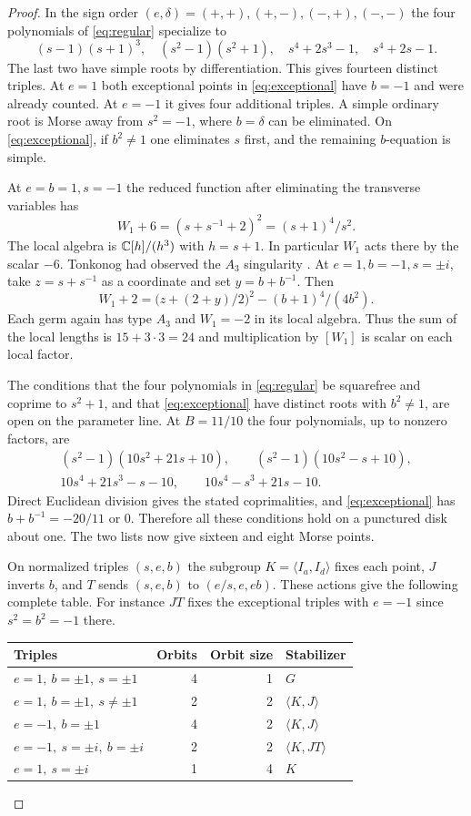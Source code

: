 \begin{proof}
In the sign order $(e,\delta)=(+,+),(+,-),(-,+),(-,-)$ the four polynomials of \eqref{eq:regular} specialize to
\[
 (s-1)(s+1)^3,\quad (s^2-1)(s^2+1),\quad s^4+2s^3-1,\quad s^4+2s-1 .
\]
The last two have simple roots by differentiation. This gives fourteen distinct triples. At $e=1$ both exceptional points in \eqref{eq:exceptional} have $b=-1$ and were already counted. At $e=-1$ it gives four additional triples. A simple ordinary root is Morse away from $s^2=-1$, where $b=\delta$ can be eliminated. On \eqref{eq:exceptional}, if $b^2\ne1$ one eliminates $s$ first, and the remaining $b$-equation is simple.

At $e=b=1,s=-1$ the reduced function after eliminating the transverse variables has
\[
             W_1+6=(s+s^{-1}+2)^2=(s+1)^4/s^2 .
\]
The local algebra is $\mathbb C[h]/(h^3)$ with $h=s+1$. In particular $W_1$ acts there by the scalar $-6$. Tonkonog had observed the $A_3$ singularity \cite[\S4.1]{Ton}. At $e=1,b=-1,s=\pm i$, take $z=s+s^{-1}$ as a coordinate and set $y=b+b^{-1}$. Then
\[
 W_1+2=\big(z+(2+y)/2\big)^2-(b+1)^4/(4b^2).
\]
Each germ again has type $A_3$ and $W_1=-2$ in its local algebra. Thus the sum of the local lengths is $15+3\cdot3=24$ and multiplication by $[W_1]$ is scalar on each local factor.

The conditions that the four polynomials in \eqref{eq:regular} be squarefree and coprime to $s^2+1$, and that \eqref{eq:exceptional} have distinct roots with $b^2\ne1$, are open on the parameter line. At $B=11/10$ the four polynomials, up to nonzero factors, are
\[
\begin{gathered}
 (s^2-1)(10s^2+21s+10),\qquad (s^2-1)(10s^2-s+10),\\
 10s^4+21s^3-s-10,\qquad 10s^4-s^3+21s-10 .
\end{gathered}
\]
Direct Euclidean division gives the stated coprimalities, and \eqref{eq:exceptional} has $b+b^{-1}=-20/11$ or $0$. Therefore all these conditions hold on a punctured disk about one. The two lists now give sixteen and eight Morse points.

On normalized triples $(s,e,b)$ the subgroup $K=\langle I_a,I_d\rangle$ fixes each point, $J$ inverts $b$, and $T$ sends $(s,e,b)$ to $(e/s,e,eb)$. These actions give the following complete table. For instance $JT$ fixes the exceptional triples with $e=-1$ since $s^2=b^2=-1$ there.
\begin{center}\small
\begin{tabular}{@{}lrrl@{}}\toprule
Triples & Orbits & Orbit size & Stabilizer\\\midrule
$e=1,\ b=\pm1,\ s=\pm1$ &4&1&$G$\\
$e=1,\ b=\pm1,\ s\ne\pm1$ &2&2&$\langle K,J\rangle$\\
$e=-1,\ b=\pm1$ &4&2&$\langle K,J\rangle$\\
$e=-1,\ s=\pm i,\ b=\pm i$ &2&2&$\langle K,JT\rangle$\\
$e=1,\ s=\pm i$ &1&4&$K$\\\bottomrule
\end{tabular}
\end{center}
\end{proof}

